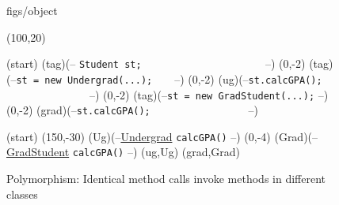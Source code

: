 






\begin {figure}


\Draw

 {figs/object}

\MinNodeSize(100,20)

\MarkLoc (start)
\Node(tag)(-- \texttt{Student st;} ~ ~ ~ ~ ~ ~ ~ ~ ~ ~ ~ ~ ~ \hfill--)
\MoveToExit(0,-2)
\Node(tag)(--\texttt{st = new Undergrad(...);} ~ ~ \hfill--)
\MoveToExit(0,-2)
\Node(ug)(--\texttt{st.calcGPA();} ~ ~ ~ ~ ~ ~ ~ ~ ~ ~ ~ \hfill--)
\MoveToExit(0,-2)
\Node(tag)(--\texttt{st = new GradStudent(...);} \hfill--)
\MoveToExit(0,-2) 
\Node(grad)(--\texttt{st.calcGPA();}~ ~ ~ ~ ~ ~ ~ ~ ~ ~ ~\hfill--)

\MoveToLoc(start)
\Move(150,-30)  
\RectNode(Ug)(--\underline{Undergrad} \hfill
		\texttt{calcGPA()} \hfill--)
\MoveToExit(0,-4)
\RectNode(Grad)(--\underline{GradStudent} \hfill
		\texttt{calcGPA()} \hfill--)
\Edge(ug,Ug)
\Edge(grad,Grad)
\EndDraw

\caption {Polymorphism: Identical method calls invoke 
methods in different classes}

\label {fig:polyMorph}

\end {figure}


